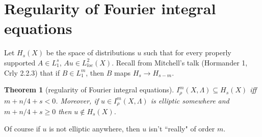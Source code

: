\documentclass[reqno,12pt,letterpaper]{amsart}
\newtheorem{theorem}{Theorem}[section]
\theoremstyle{definition}
\begin{document}
\section{Regularity of Fourier integral equations}
Let $H_s(X)$ be the space of distributions $u$ such that for every properly supported $A \in L^s_1$, $Au \in L^2_{loc}(X)$.
Recall from Mitchell's talk (Hormander 1, Crly 2.2.3) that if $B \in L^m_1$, then $B$ maps $H_s \to H_{s - m}$.

\begin{theorem}[regularity of Fourier integral equations]
$I^m_\rho(X, \Lambda) \subseteq H_s(X)$ iff $m + n/4 + s < 0$.
Moreover, if $u \in I^m_\rho(X, \Lambda)$ is elliptic somewhere and $m + n/4 + s \geq 0$ then $u \notin H_s(X)$.
\end{theorem}
Of course if $u$ is not elliptic anywhere, then $u$ isn't ``really" of order $m$.
\end{document}
